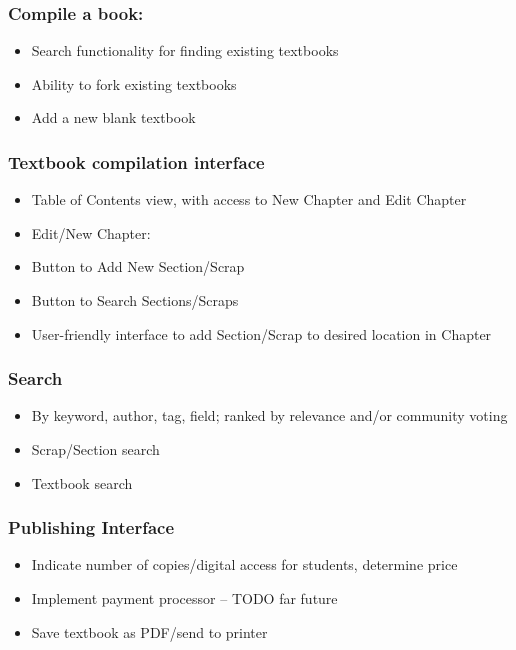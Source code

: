 \documentclass[letterpaper, 10pt, draftclsnofoot, onecolumn]{IEEEtran}
\begin{document}
\subsubsection[System feature 2: [ Compile a book
{]}]{\rmfamily\bfseries\color{black} Compile a book: 
}
\begin{itemize}
\item Search functionality for finding existing textbooks
\item Ability to fork existing textbooks
\item Add a new blank textbook
\end{itemize}

\subsubsection[System feature 3: [ Textbook Compilation Interface
{]}]{\rmfamily\bfseries\color{black} Textbook compilation interface
}
\begin{itemize}
\item Table of Contents view, with access to New Chapter and Edit Chapter
\item Edit/New Chapter:
\item Button to Add New Section/Scrap
\item Button to Search Sections/Scraps
\item User-friendly interface to add Section/Scrap to desired location in Chapter
\end{itemize}

\subsubsection[System feature 4: [ insert feature name here
{]}]{\rmfamily\bfseries\color{black} Search 
}
\begin{itemize}
\item By keyword, author, tag, field; ranked by relevance and/or community voting
\item Scrap/Section search
\item Textbook search
\end{itemize}

\subsubsection[System feature 5: [ Publishing Interface
{]}]{\rmfamily\bfseries\color{black} Publishing Interface
}
\begin{itemize}
\item Indicate number of copies/digital access for students, determine price
\item Implement payment processor -- TODO far future
\item Save textbook as PDF/send to printer
\end{itemize}
\end{document}
